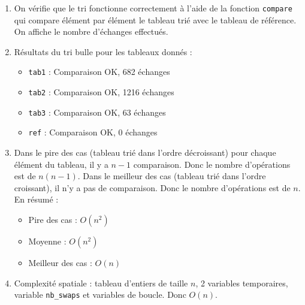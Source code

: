 \documentclass[12pt]{article}
\begin{document}
\begin{enumerate}[resume]
    \item On vérifie que le tri fonctionne correctement à l'aide de la fonction \texttt{compare} qui compare élément par élément le tableau trié avec le tableau de référence. On affiche le nombre d'échanges effectués.
    \item Résultats du tri bulle pour les tableaux donnés :
    \begin{itemize}
        \item \texttt{tab1} : Comparaison OK, 682 échanges
        \item \texttt{tab2} : Comparaison OK, 1216 échanges
        \item \texttt{tab3} : Comparaison OK, 63 échanges
        \item \texttt{ref} : Comparaison OK, 0 échanges
    \end{itemize}
    \item Dans le pire des cas (tableau trié dans l'ordre décroissant) pour chaque élément du tableau, il y a $n-1$ comparaison. Donc le nombre d'opérations est de $n(n-1)$. Dans le meilleur des cas (tableau trié dans l'ordre croissant), il n'y a pas de comparaison. Donc le nombre d'opérations est de $n$. En résumé :
    \begin{itemize}
        \item Pire des cas : $O(n^2)$ 
        \item Moyenne : $O(n^2)$
        \item Meilleur des cas : $O(n)$
    \end{itemize}
    \item Complexité spatiale : tableau d'entiers de taille $n$, 2 variables temporaires, variable \texttt{nb\_swaps} et variables de boucle. Donc $O(n)$.
\end{enumerate}

\newpage 
\end{document}
